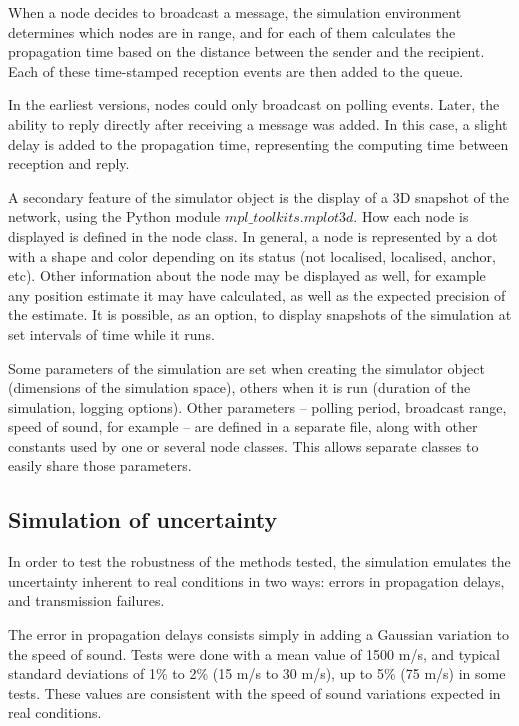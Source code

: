 \documentclass[12pt,a4paper,fleqn]{report}
\begin{document}
When a node decides to broadcast a message, the simulation environment determines which nodes are in range, and for each of them calculates the propagation time based on the distance between the sender and the recipient. Each of these time-stamped reception events are then added to the queue.

In the earliest versions, nodes could only broadcast on polling events. Later, the ability to reply directly after receiving a message was added. In this case, a slight delay is added to the propagation time, representing the computing time between reception and reply.

A secondary feature of the simulator object is the display of a 3D snapshot of the network, using the Python module $mpl\_toolkits.mplot3d$. How each node is displayed is defined in the node class. In general, a node is represented by a dot with a shape and color depending on its status (not localised, localised, anchor, etc). Other information about the node may be displayed as well, for example any position estimate it may have calculated, as well as the expected precision of the estimate. It is possible, as an option, to display snapshots of the simulation at set intervals of time while it runs.

Some parameters of the simulation are set when creating the simulator object (dimensions of the simulation space), others when it is run (duration of the simulation, logging options). Other parameters – polling period, broadcast range, speed of sound, for example – are defined in a separate file, along with other constants used by one or several node classes. This allows separate classes to easily share those parameters.

\subsection{Simulation of uncertainty}

In order to test the robustness of the methods tested, the simulation emulates the uncertainty inherent to real conditions in two ways: errors in propagation delays, and transmission failures.

The error in propagation delays consists simply in adding a Gaussian variation to the speed of sound. Tests were done with a mean value of 1500 m/s, and typical standard deviations of 1\% to 2\% (15 m/s to 30 m/s), up to 5\% (75 m/s) in some tests. These values are consistent with the speed of sound variations expected in real conditions.
\end{document}
